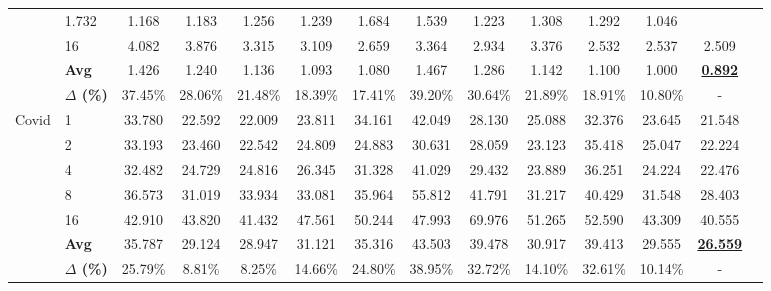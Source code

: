 \begin{table*}[t]
{\begin{tabular}{llcccccccccccc}
        & 1.732 & \cellcolor{low2}1.168 & \cellcolor{low3}1.183 & 1.256 
        & 1.239 & 1.684 & 1.539 & 1.223 
        & 1.308 & 1.292 & \cellcolor{low1}1.046 \\[2pt]
      & 16 
        & 4.082 & 3.876 & 3.315 & 3.109 
        & 2.659 & 3.364 & 2.934 & 3.376 
        & \cellcolor{low2}2.532 & \cellcolor{low3}2.537 & \cellcolor{low1}2.509 \\[2pt]
        & \textbf{Avg} 
          & 1.426 & 1.240 & 1.136 & 1.093 
          & \cellcolor{low3}1.080 & 1.467 & 1.286 & 1.142 
          & 1.100 & \cellcolor{low2}1.000 & \cellcolor{low1}\textbf{\underline{0.892}} \\
        & \textbf{$\Delta$ (\%)} 
          & 37.45\% & 28.06\% & 21.48\% & 18.39\% 
          & 17.41\% & 39.20\% & 30.64\% & 21.89\% 
          & 18.91\% & 10.80\% & - \\
    \midrule
    \multirow{7}{*}{Covid} 
      & 1  
        & 33.780 & \cellcolor{low2}22.592 & \cellcolor{low3}22.009 & 23.811 
        & 34.161 & 42.049 & 28.130 & 25.088 
        & 32.376 & 23.645 & \cellcolor{low1}21.548 \\[2pt]
      & 2  
        & 33.193 & 23.460 & \cellcolor{low2}22.542 & 24.809 
        & 24.883 & 30.631 & 28.059 & \cellcolor{low3}23.123 
        & 35.418 & 25.047 & \cellcolor{low1}22.224 \\[2pt]
      & 4  
        & 32.482 & 24.729 & 24.816 & 26.345 
        & 31.328 & 41.029 & 29.432 & \cellcolor{low2}23.889 
        & 36.251 & \cellcolor{low3}24.224 & \cellcolor{low1}22.476 \\[2pt]
      & 8  
        & 36.573 & \cellcolor{low2}31.019 & 33.934 & 33.081 
        & 35.964 & 55.812 & 41.791 & \cellcolor{low3}31.217 
        & 40.429 & 31.548 & \cellcolor{low1}28.403 \\[2pt]
      & 16 
        & \cellcolor{low3}42.910 & 43.820 & \cellcolor{low2}41.432 & 47.561 
        & 50.244 & 47.993 & 69.976 & 51.265 
        & 52.590 & 43.309 & \cellcolor{low1}40.555 \\[2pt]
        & \textbf{Avg} 
          & 35.787 & \cellcolor{low3}29.124 & \cellcolor{low2}28.947 & 31.121 
          & 35.316 & 43.503 & 39.478 & 30.917 
          & 39.413 & 29.555 & \cellcolor{low1}\textbf{\underline{26.559}} \\
        & \textbf{$\Delta$ (\%)} 
          & 25.79\% & 8.81\% & 8.25\% & 14.66\% 
          & 24.80\% & 38.95\% & 32.72\% & 14.10\% 
          & 32.61\% & 10.14\% & - \\
    \bottomrule
\end{tabular}
    }
\end{table*}


